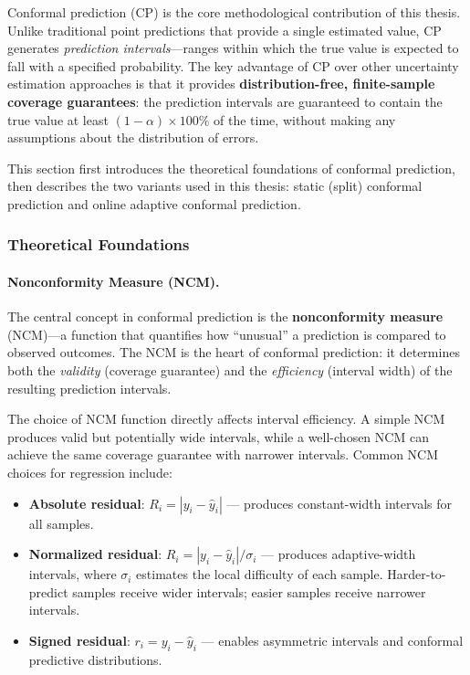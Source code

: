 Conformal prediction (CP) is the core methodological contribution of this thesis. Unlike traditional point predictions that provide a single estimated value, CP generates \emph{prediction intervals}—ranges within which the true value is expected to fall with a specified probability. The key advantage of CP over other uncertainty estimation approaches is that it provides \textbf{distribution-free, finite-sample coverage guarantees}: the prediction intervals are guaranteed to contain the true value at least $(1-\alpha) \times 100\%$ of the time, without making any assumptions about the distribution of errors.

This section first introduces the theoretical foundations of conformal prediction, then describes the two variants used in this thesis: static (split) conformal prediction and online adaptive conformal prediction.

\subsubsection{Theoretical Foundations}
\label{subsubsec:cp_theory}

\paragraph{Nonconformity Measure (NCM).}
The central concept in conformal prediction is the \textbf{nonconformity measure} (NCM)—a function that quantifies how ``unusual'' a prediction is compared to observed outcomes. The NCM is the heart of conformal prediction: it determines both the \emph{validity} (coverage guarantee) and the \emph{efficiency} (interval width) of the resulting prediction intervals.

The choice of NCM function directly affects interval efficiency. A simple NCM produces valid but potentially wide intervals, while a well-chosen NCM can achieve the same coverage guarantee with narrower intervals. Common NCM choices for regression include:

\begin{itemize}
    \item \textbf{Absolute residual}: $R_i = |y_i - \hat{y}_i|$ — produces constant-width intervals for all samples.
    \item \textbf{Normalized residual}: $R_i = |y_i - \hat{y}_i| / \sigma_i$ — produces adaptive-width intervals, where $\sigma_i$ estimates the local difficulty of each sample. Harder-to-predict samples receive wider intervals; easier samples receive narrower intervals.
    \item \textbf{Signed residual}: $r_i = y_i - \hat{y}_i$ — enables asymmetric intervals and conformal predictive distributions.
\end{itemize}

